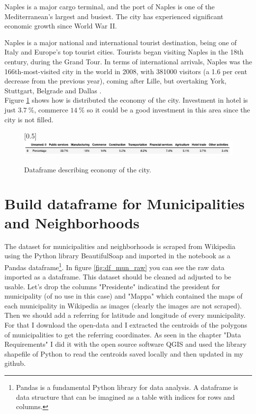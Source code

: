 \documentclass[a4paper, 12pt, oneside]{book}
\begin{document}
Naples is a major cargo terminal, and the port of Naples is one of the Mediterranean's largest and busiest. The city has experienced significant economic growth since World War II.

Naples is a major national and international tourist destination, being one of Italy and Europe's top tourist cities. Tourists began visiting Naples in the 18th century, during the Grand Tour. In terms of international arrivals, Naples was the 166th-most-visited city in the world in 2008, with 381000 visitors (a 1.6 per cent decrease from the previous year), coming after Lille, but overtaking York, Stuttgart, Belgrade and Dallas \cite{economics}.\\

Figure \ref{fig:df_economy} shows how is distributed the economy of the city. Investment in hotel is just $3.7~\%$, commerce $14~\%$ so it could be a good investment in this area since the city is not filled.

\begin{figure}[!htb]
		\centering
		\scalebox{0.45}[0.5]{\includegraphics{immagini/dataframe_economics.jpg}}
		\caption{Dataframe describing economy of the city. }
		\label{fig:df_economy}
	\end{figure}
\clearpage

\section*{Build dataframe for Municipalities and Neighborhoods} 
\label{sec:df_municipality}
The dataset for municipalities and neighborhoods is scraped from Wikipedia\cite{municipalities} using the Python library BeautifulSoap and imported in the notebook as a Pandas dataframe\footnote{Pandas is a fundamental Python library for data analysis. A dataframe is data structure that can be imagined as a table with indices for rows and columns.}. In figure \ref{fig:df_mun_raw} you can see the raw data imported as a dataframe.
This dataset should be cleaned ad adjusted to be usable. Let's drop the columns "Presidente" indicatind the president for municipality (of no use in this case) and "Mappa" which contained the maps of each municipality in Wikipedia as images (clearly the images are not scraped). Then we should add a referring for latitude and longitude of every municipality. For that I download the open-data \cite{opendata} and I extracted the centroids of the polygons of municipalities to get the referring coordinates. As seen in the chapter "Data Requirements" I did it with the open source software QGIS and used the library shapefile of Python to read the centroids saved locally and then updated in my github\cite{dataset}.  
\end{document}
